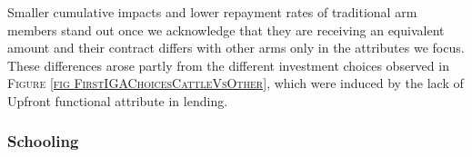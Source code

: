 	Smaller cumulative impacts and lower repayment rates of \textsf{traditional} arm members stand out once we acknowledge that they are receiving an equivalent amount and their contract differs with other arms only in the attributes we focus. These differences arose partly from the different investment choices observed in \textsc{\small Figure \ref{fig FirstIGAChoicesCattleVsOther}}, which were induced by the lack of \textsf{Upfront} functional attribute in lending.
	
% 
%
%

\subsubsection{Schooling}



